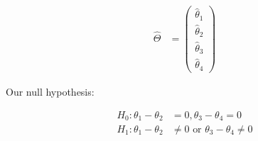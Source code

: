 \documentclass{article}
\newtheorem{corollary}{Corollary}[theorem]
\begin{document}
\begin{align*}
    \hat{\Theta} &= \begin{pmatrix}
       \hat{\theta}_1 \\
       \hat{\theta}_2 \\
       \hat{\theta}_3 \\
       \hat{\theta}_4 
    \end{pmatrix} 
\end{align*}


Our null hypothesis:

\begin{align*}
    H_0: \theta_1 - \theta_2 &= 0, \theta_3 - \theta_4 = 0 \\
    H_1: \theta_1 - \theta_2 &\neq 0 \text{ or } \theta_3 - \theta_4 \neq 0 \\
\end{align*}

    
    
    
    
    
    
    
    
\end{document}
